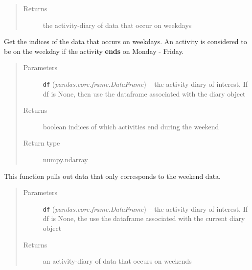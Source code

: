 \documentclass[letterpaper,10pt,english]{sphinxmanual}
\begin{document}
\begin{fulllineitems}
\begin{fulllineitems}
\begin{quote}
\begin{description}
\item[{Returns}] \leavevmode
the activity-diary of data that occur on weekdays

\end{description}\end{quote}

\end{fulllineitems}


\begin{fulllineitems}
\label{diary:diary.Diary.get_weekday_idx}
Get the indices of the data that occurs on weekdays. An activity is considered to be on the weekday if         the activity \textbf{ends} on Monday - Friday.
\begin{quote}\begin{description}
\item[{Parameters}] \leavevmode
\textbf{\texttt{df}} (\emph{pandas.core.frame.DataFrame}) -- the activity-diary of interest. If df is None, then use the dataframe         associated with the diary object

\item[{Returns}] \leavevmode
boolean indices of which activities end during the weekend

\item[{Return type}] \leavevmode
numpy.ndarray

\end{description}\end{quote}

\end{fulllineitems}


\begin{fulllineitems}
\label{diary:diary.Diary.get_weekend_data}
This function pulls out data that only corresponds to the weekend data.
\begin{quote}\begin{description}
\item[{Parameters}] \leavevmode
\textbf{\texttt{df}} (\emph{pandas.core.frame.DataFrame}) -- the activity-diary of interest. If df is None, the use  the dataframe         associated with the current diary object

\item[{Returns}] \leavevmode
an activity-diary of data that occurs on weekends


\end{description}
\end{quote}
\end{fulllineitems}
\end{fulllineitems}
\end{document}
